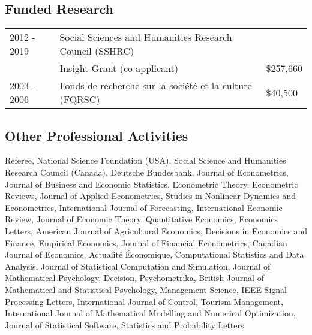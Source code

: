 \documentclass[12pt]{article}
\begin{document}





\subsection*{Funded Research}

\begin{tabular}{lll}
2012 - 2019
& Social Sciences and Humanities Research Council (SSHRC) \\
& Insight Grant (co-applicant)
& \$257,660 \\
2003 - 2006
& Fonds de recherche sur la soci\'et\'e et la culture (FQRSC)
& \$40,500 \\
\end{tabular}

\subsection*{Other Professional Activities}

Referee,
National Science Foundation (USA),
Social Science and Humanities Research Council (Canada),
Deutsche Bundesbank,
Journal of Econometrics,
Journal of Business and Economic Statistics,
Econometric Theory,
Econometric Reviews,
Journal of Applied Econometrics,
Studies in Nonlinear Dynamics and Econometrics,
International Journal of Forecasting,
International Economic Review,
Journal of Economic Theory,
Quantitative Economics,
Economics Letters,
American Journal of Agricultural Economics,
Decisions in Economics and Finance,
Empirical Economics,
Journal of Financial Econometrics,
Canadian Journal of Economics,
Actualit\'e \'Economique,
Computational Statistics and Data Analysis,
Journal of Statistical Computation and Simulation,
Journal of Mathematical Psychology,
Decision,
Psychometrika,
British Journal of Mathematical and Statistical Psychology,
Management Science,
IEEE Signal Processing Letters,
International Journal of Control,
Tourism Management,
International Journal of Mathematical Modelling and Numerical Optimization,
Journal of Statistical Software,
Statistics and Probability Letters
\end{document}
